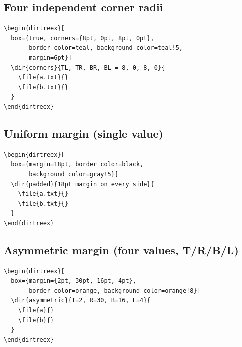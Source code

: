 \documentclass[11pt]{article}
\begin{document}
\subsection{Four independent corner radii}

\begin{Verbatim}
\begin{dirtreex}[
  box={true, corners={8pt, 0pt, 8pt, 0pt},
       border color=teal, background color=teal!5,
       margin=6pt}]
  \dir{corners}{TL, TR, BR, BL = 8, 0, 8, 0}{
    \file{a.txt}{}
    \file{b.txt}{}
  }
\end{dirtreex}
\end{Verbatim}

\begin{dirtreex}[
  box={true, corners={8pt, 0pt, 8pt, 0pt},
       border color=teal, background color=teal!5,
       margin=6pt}]
\end{dirtreex}

\subsection{Uniform margin (single value)}

\begin{Verbatim}
\begin{dirtreex}[
  box={margin=18pt, border color=black,
       background color=gray!5}]
  \dir{padded}{18pt margin on every side}{
    \file{a.txt}{}
    \file{b.txt}{}
  }
\end{dirtreex}
\end{Verbatim}

\begin{dirtreex}[
  box={margin=18pt, border color=black,
       background color=gray!5}]
\end{dirtreex}

\subsection{Asymmetric margin (four values, T/R/B/L)}

\begin{Verbatim}
\begin{dirtreex}[
  box={margin={2pt, 30pt, 16pt, 4pt},
       border color=orange, background color=orange!8}]
  \dir{asymmetric}{T=2, R=30, B=16, L=4}{
    \file{a}{}
    \file{b}{}
  }
\end{dirtreex}
\end{Verbatim}
\end{document}
